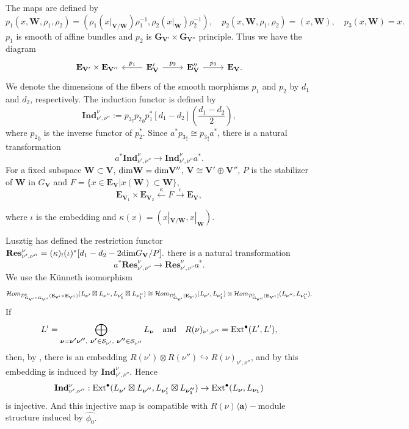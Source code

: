 \documentclass[10pt,a4paper]{amsart}
\def\Ext{\mbox{\rm Ext}}   \def\Ker{\mbox{\rm Ker}\,}
\def\dim{\mbox{\rm dim}}   \def\End{\mbox{\rm End}}
\def\bfV{{\mathbf V}}
\def\bfV{\mathbf{V}}
\def\bfW{\mathbf{W}}
\def\bfE{\mathbf{E}}
\def\bfG{\mathbf{G}}
\def\Ind{\mathbf{Ind}}
\def\Res{\mathbf{Res}}
\begin{document}
The maps are defined by
\[
p_1(x,\bfW,\rho_1,\rho_2)=(\rho_1(x|_{\bfV/\bfW})\rho_1^{-1},\rho_2(x|_{\bfW})\rho_2^{-1}),
\quad p_2(x,\bfW,\rho_1,\rho_2)=(x,\bfW),
\quad p_3(x,\bfW)=x.
\]
$p_1$ is smooth of affine bundles and $p_2$ is $\bfG_{\bfV'}\times \bfG_{\bfV''}$ principle.
Thus we have the diagram
\[
\begin{tikzcd}
\bfE_{\bfV'}\times \bfE_{\bfV''} & \bfE_{\bfV}' \arrow[l, "p_1"'] \arrow[r, "p_2"] & \bfE_{\bfV}'' \arrow[r, "p_3"] & \bfE_{\bfV}.
\end{tikzcd}
\]
We denote the dimensions of the fibers of the smooth morphisms $p_1$ and $p_2$ by $d_1$ and $d_2$, respectively. The induction functor is defined by
\[
\Ind_{\nu',\nu''}^{\nu} := {p_3}_! {p_2}_b p_1^* [d_1 - d_2] \left( \frac{d_1 - d_2}{2} \right),
\] where ${p_2}_b$ is the inverse functor of $p_2^*.$
Since $a^* {p_3}_! \cong {p_3}_! a^*$, there is a natural transformation
\[
a^* \Ind_{\nu',\nu''}^{\nu} \rightarrow \Ind_{\nu',\nu''}^{\nu} a^*.
\]
For a fixed subspace $\bfW\subset \bfV$, $\dim \bfW=\dim \bfV''$, $\bfV\cong \bfV'\oplus\bfV''$, $P$ is the stabilizer of $\bfW$ in $G_{\bfV}$ and $F=\{x\in \bfE_{\bfV}|x(\bfW)\subset \bfW\},$ $$\bfE_{\bfV_1}\times \bfE_{\bfV_2}\xleftarrow{\kappa}F\xrightarrow{\iota}\bfE_{\bfV},$$

where $\iota$ is the embedding and $\kappa(x)=(x|_{\bfV/\bfW},x|_{\bfW})$.

Lusztig has defined the restriction functor $\mathbf{Res}_{\nu',\nu''}^{\nu}=(\kappa)_!(\iota)^*[d_1-d_2-2\dim G_{\bfV}/P].$
there is a natural transformation
\[
a^* \Res_{\nu',\nu''}^{\nu} \rightarrow \Res_{\nu',\nu''}^{\nu} a^*.
\]
We use the K\"unneth isomorphism
\[
\mathcal{H}om_{\cD^b_{\bfG_{\bfV'}\times \bfG_{\bfV''}}(\bfE_{\bfV'}\times \bfE_{\bfV''})}
(L_{\boldsymbol{\nu'}}\boxtimes L_{\boldsymbol{\nu''}},L_{\boldsymbol{\nu_1'}}\boxtimes L_{\boldsymbol{\nu_1''}})
\cong
\mathcal{H}om_{\cD^b_{\bfG_{\bfV'}}(\bfE_{\bfV'})}(L_{\boldsymbol{\nu'}},L_{\boldsymbol{\nu_1'}})
\otimes
\mathcal{H}om_{\cD^b_{\bfG_{\bfV''}}(\bfE_{\bfV''})}(L_{\boldsymbol{\nu''}},L_{\boldsymbol{\nu_1''}}).
\]
If
\[
L'=\bigoplus_{\boldsymbol{\nu}=\boldsymbol{\nu'}\boldsymbol{\nu''},\ \boldsymbol{\nu'}\in \mathcal{S}_{\nu'},\ \boldsymbol{\nu''}\in \mathcal{S}_{\nu''}} L_{\boldsymbol{\nu}}
\quad \text{and} \quad
R(\nu)_{\nu',\nu''}=\Ext^{\bullet}(L',L'),
\]
then, by \cite[4.1]{VaragnoloVasserot+2011+67+100}, there is an embedding
$R(\nu')\otimes R(\nu'')\hookrightarrow R(\nu)_{\nu',\nu''}$, and by \cite[Theorem 5.7 and 5.4.3]{doi:10.1142/S1005386712000247} this embedding is induced by $\Ind_{\nu',\nu''}^{\nu}$. Hence
\begin{equation}\label{1}
\Ind_{\nu',\nu''}^{\nu}:
\Ext^{\bullet}(L_{\boldsymbol{\nu'}}\boxtimes L_{\boldsymbol{\nu''}},L_{\boldsymbol{\nu_1'}}\boxtimes L_{\boldsymbol{\nu_1''}})
\rightarrow
\Ext^{\bullet}(L_{\boldsymbol{\nu}},L_{\boldsymbol{\nu_1}})
\end{equation}
is injective. And this injective map is compatible with $R(\nu)\langle\mathbf{a}\rangle-$module structure induced by $\hat{\phi_0}.$
\end{document}
